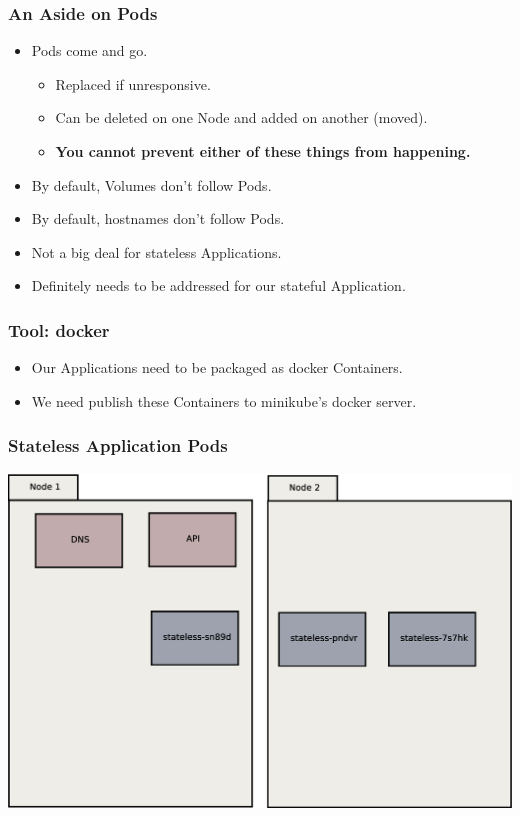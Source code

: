     \begin{frame}
        \frametitle{An Aside on Pods}
        \begin{itemize}
            \item Pods come and go.\pause
            \begin{itemize}
                \item Replaced if unresponsive.\pause
                \item Can be deleted on one Node and added on another (moved).\pause
                \item \textbf{You cannot prevent either of these things from happening.}\pause
            \end{itemize}
            \item By default, Volumes don't follow Pods.\pause
            \item By default, hostnames don't follow Pods.\pause
            \item Not a big deal for stateless Applications.\pause
            \item Definitely needs to be addressed for our stateful Application.
        \end{itemize}
    \end{frame}

    \begin{frame}
        \frametitle{Tool: docker\footnotemark}
        \begin{itemize}
            \item Our Applications need to be packaged as docker Containers.
            \item We need publish these Containers to minikube's docker server.
        \end{itemize}
    \end{frame}

    \begin{frame}
        \frametitle{Stateless Application Pods}
        \includegraphics[width=\textwidth,height=0.85\textheight,keepaspectratio]{graphics/02-statelessAppPods.eps}
    \end{frame}

